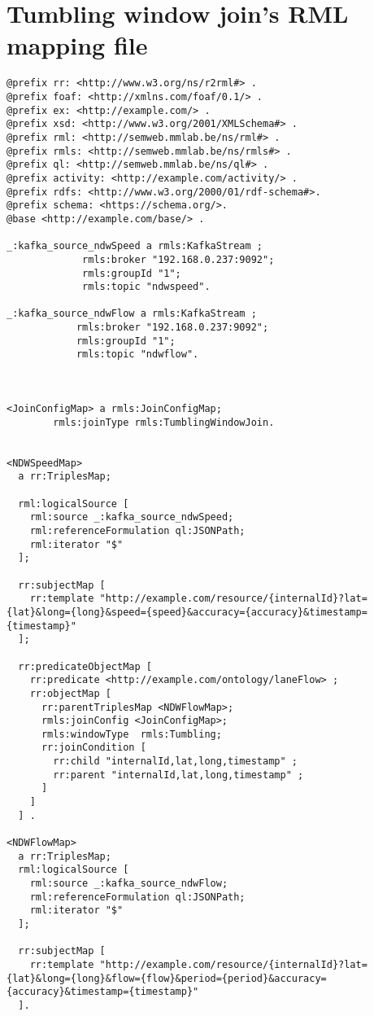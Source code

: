 \section{Tumbling window join's RML mapping file}
\begin{lstlisting}[label={lst:tumbling_mapping_file}]
@prefix rr: <http://www.w3.org/ns/r2rml#> .
@prefix foaf: <http://xmlns.com/foaf/0.1/> .
@prefix ex: <http://example.com/> .
@prefix xsd: <http://www.w3.org/2001/XMLSchema#> .
@prefix rml: <http://semweb.mmlab.be/ns/rml#> .
@prefix rmls: <http://semweb.mmlab.be/ns/rmls#> .
@prefix ql: <http://semweb.mmlab.be/ns/ql#> .
@prefix activity: <http://example.com/activity/> .
@prefix rdfs: <http://www.w3.org/2000/01/rdf-schema#>.
@prefix schema: <https://schema.org/>. 
@base <http://example.com/base/> .

_:kafka_source_ndwSpeed a rmls:KafkaStream ;
             rmls:broker "192.168.0.237:9092";
             rmls:groupId "1";
             rmls:topic "ndwspeed".

_:kafka_source_ndwFlow a rmls:KafkaStream ; 
            rmls:broker "192.168.0.237:9092"; 
            rmls:groupId "1"; 
            rmls:topic "ndwflow". 



<JoinConfigMap> a rmls:JoinConfigMap;
        rmls:joinType rmls:TumblingWindowJoin.


<NDWSpeedMap>
  a rr:TriplesMap;

  rml:logicalSource [
    rml:source _:kafka_source_ndwSpeed;
    rml:referenceFormulation ql:JSONPath;
    rml:iterator "$"
  ];

  rr:subjectMap [
    rr:template "http://example.com/resource/{internalId}?lat={lat}&long={long}&speed={speed}&accuracy={accuracy}&timestamp={timestamp}" 
  ];

  rr:predicateObjectMap [
    rr:predicate <http://example.com/ontology/laneFlow> ;
    rr:objectMap [
      rr:parentTriplesMap <NDWFlowMap>;
      rmls:joinConfig <JoinConfigMap>;
      rmls:windowType  rmls:Tumbling;
      rr:joinCondition [
        rr:child "internalId,lat,long,timestamp" ;
        rr:parent "internalId,lat,long,timestamp" ;
      ]
    ]
  ] .

<NDWFlowMap>
  a rr:TriplesMap;
  rml:logicalSource [
    rml:source _:kafka_source_ndwFlow;
    rml:referenceFormulation ql:JSONPath;
    rml:iterator "$"
  ];

  rr:subjectMap [
    rr:template "http://example.com/resource/{internalId}?lat={lat}&long={long}&flow={flow}&period={period}&accuracy={accuracy}&timestamp={timestamp}"
  ].
\end{lstlisting}


